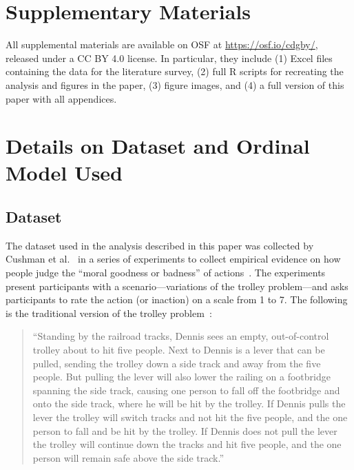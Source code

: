 \documentclass{vgtc}                          %
\begin{document}
%

%
%
%



\appendix

\section{Supplementary Materials}
\label{appendix:supp}
All supplemental materials are available on OSF at \url{https://osf.io/cdgby/}, released under a CC BY 4.0 license. In particular, they include (1) Excel files containing the data for the literature survey, (2) full R scripts for recreating the analysis and figures in the paper, (3) figure images, and (4) a full version of this paper with all appendices.

\section{Details on Dataset and Ordinal Model Used}
\label{appendix:model-details}

\subsection{Dataset}
The dataset used in the analysis described in this paper was collected by Cushman et al.~\cite{cushman_role_2006} in a series of experiments to collect empirical evidence on how people judge the ``moral goodness or badness'' of actions~\cite{mcelreath_statistical_2020}. The experiments present participants with a scenario---variations of the trolley problem---and asks participants to rate the action (or inaction) on a scale from 1 to 7. The following is the traditional version of the trolley problem~\cite{mcelreath_statistical_2020}:

\begin{quote}
``Standing by the railroad tracks, Dennis sees an empty, out-of-control trolley about to hit five people. Next to Dennis is a lever that can be pulled, sending the trolley down a side track and away from the five people. But pulling the lever will also lower the railing on a footbridge spanning the side track, causing one person to fall off the footbridge and onto the side track, where he will be hit by the trolley. If Dennis pulls the lever the trolley will switch tracks and not hit the five people, and the one person to fall and be hit by the trolley. If Dennis does not pull the lever the trolley will continue down the tracks and hit five people, and the one person will remain safe above the side track.''
\end{quote}
\end{document}
